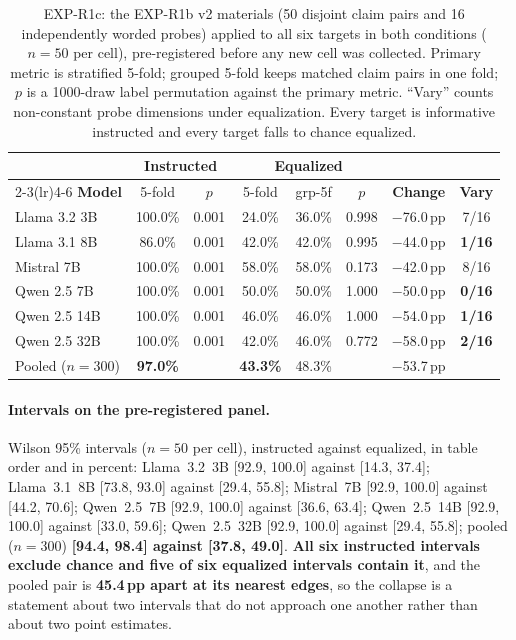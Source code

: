 \begin{table}[h]
\centering
\small
\setlength{\tabcolsep}{4pt}
\caption{EXP-R1c: the EXP-R1b v2 materials (50 disjoint claim pairs and 16 independently worded probes) applied to all six targets in both conditions ($n=50$ per cell), pre-registered before any new cell was collected. Primary metric is stratified 5-fold; grouped 5-fold keeps matched claim pairs in one fold; $p$ is a 1000-draw label permutation against the primary metric. ``Vary'' counts non-constant probe dimensions under equalization. Every target is informative instructed and every target falls to chance equalized.}
\label{tab:r1c_v2}
\begin{tabular}{lccccccc}
\toprule
& \multicolumn{2}{c}{\textbf{Instructed}} & \multicolumn{3}{c}{\textbf{Equalized}} & & \\
\cmidrule(lr){2-3}\cmidrule(lr){4-6}
\textbf{Model} & 5-fold & \textbf{$p$} & 5-fold & grp-5f & \textbf{$p$} & \textbf{Change} & \textbf{Vary} \\
\midrule
Llama 3.2 3B  & 100.0\% & 0.001 & 24.0\% & 36.0\% & 0.998 & $-$76.0\,pp & 7/16 \\
Llama 3.1 8B  & \phantom{0}86.0\% & 0.001 & 42.0\% & 42.0\% & 0.995 & $-$44.0\,pp & \textbf{1/16} \\
Mistral 7B    & 100.0\% & 0.001 & 58.0\% & 58.0\% & 0.173 & $-$42.0\,pp & 8/16 \\
Qwen 2.5 7B   & 100.0\% & 0.001 & 50.0\% & 50.0\% & 1.000 & $-$50.0\,pp & \textbf{0/16} \\
Qwen 2.5 14B  & 100.0\% & 0.001 & 46.0\% & 46.0\% & 1.000 & $-$54.0\,pp & \textbf{1/16} \\
Qwen 2.5 32B  & 100.0\% & 0.001 & 42.0\% & 46.0\% & 0.772 & $-$58.0\,pp & \textbf{2/16} \\
\midrule
Pooled ($n{=}300$) & \textbf{97.0\%} & & \textbf{43.3\%} & 48.3\% & & $-$53.7\,pp & \\
\bottomrule
\end{tabular}
\end{table}

\paragraph{Intervals on the pre-registered panel.} Wilson 95\% intervals ($n\!=\!50$ per cell), instructed against equalized, in table order and in percent: Llama~3.2~3B [92.9, 100.0] against [14.3, 37.4]; Llama~3.1~8B [73.8, 93.0] against [29.4, 55.8]; Mistral~7B [92.9, 100.0] against [44.2, 70.6]; Qwen~2.5~7B [92.9, 100.0] against [36.6, 63.4]; Qwen~2.5~14B [92.9, 100.0] against [33.0, 59.6]; Qwen~2.5~32B [92.9, 100.0] against [29.4, 55.8]; pooled ($n\!=\!300$) \textbf{[94.4, 98.4] against [37.8, 49.0]}. \textbf{All six instructed intervals exclude chance and five of six equalized intervals contain it}, and the pooled pair is \textbf{45.4\,pp apart at its nearest edges}, so the collapse is a statement about two intervals that do not approach one another rather than about two point estimates.

